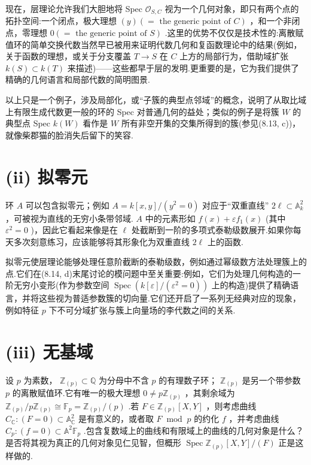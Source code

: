 现在，层理论允许我们大胆地将 Spec \({\mathcal{O}}_{S,C}\) 视为一个几何对象，即只有两个点的拓扑空间:一个闭点，极大理想 \(\left( y\right) \left( { = \text{ the generic point of }C}\right)\) ，和一个非闭点，零理想 \(0\left( { = \text{ the generic point of }S}\right)\) .这里的优势不仅仅是技术性的:离散赋值环的简单交换代数当然早已被用来证明代数几何和复函数理论中的结果(例如，关于函数的理想，或关于分支覆盖 \(T \rightarrow  S\) 在 \(C\) 上方的局部行为，借助域扩张 \(k\left( S\right)  \subset  k\left( T\right)\) 来描述)——这些都早于层的发明.更重要的是，它为我们提供了精确的几何语言和局部代数的简明图景.

以上只是一个例子，涉及局部化，或“子簇的典型点邻域”的概念，说明了从取比域上有限生成代数更一般的环的 Spec 对普通几何的益处；类似的例子是将簇 \(W\) 的典型点 Spec \(k\left( W\right)\) 看作是 \(W\) 所有非空开集的交集所得到的簇(参见(8.13, c))，就像柴郡猫的脸消失后留下的笑容.

\section{(ii) 拟零元}

环 \(A\) 可以包含拟零元；例如 \(A = k\left\lbrack  {x,y}\right\rbrack  /\left( {{y}^{2} = 0}\right)\) 对应于“双重直线” \(2\ell  \subset  {\mathbb{A}}_{k}^{2}\) ，可被视为直线的无穷小条带邻域. \(A\) 中的元素形如 \(f\left( x\right)  + \varepsilon {f}_{1}\left( x\right)\) (其中 \({\varepsilon }^{2} = 0\) )，因此它看起来像是在 \(\ell\) 处截断到一阶的多项式泰勒级数展开.如果你每天多次刻意练习，应该能够将其形象化为双重直线 \(2\ell\) 上的函数.

拟零元使层理论能够处理任意阶截断的泰勒级数，例如通过幂级数方法处理簇上的点.它们在(8.14, d)末尾讨论的模问题中至关重要:例如，它们为处理几何构造的一阶无穷小变形(作为参数空间 \(\operatorname{Spec}\left( {k\left\lbrack  \varepsilon \right\rbrack  /\left( {{\varepsilon }^{2} = 0}\right) }\right)\) 上的构造)提供了精确语言，并将这些视为普适参数簇的切向量.它们还开启了一系列无经典对应的现象，例如特征 \(p\) 下不可分域扩张与簇上向量场的李代数之间的关系.

\section{(iii) 无基域}

设 \(p\) 为素数， \({\mathbb{Z}}_{\left( p\right) } \subset  \mathbb{Q}\) 为分母中不含 \(p\) 的有理数子环； \({\mathbb{Z}}_{\left( p\right) }\) 是另一个带参数 \(p\) 的离散赋值环.它有唯一的极大理想 \(0 \neq  p{\mathbb{Z}}_{\left( p\right) }\) ，其剩余域为 \({\mathbb{Z}}_{\left( p\right) }/p{\mathbb{Z}}_{\left( p\right) } \cong  {\mathbb{F}}_{p} = {\mathbb{Z}}_{\left( p\right) }/\left( p\right)\) .若 \(F \in  {\mathbb{Z}}_{\left( p\right) }\left\lbrack  {X,Y}\right\rbrack\) ，则考虑曲线 \({C}_{\mathbb{C}} : \left( {F = 0}\right)  \subset  {\mathbb{A}}_{\mathbb{C}}^{2}\) 是有意义的，或者取 \(F{\;\operatorname{mod}\;p}\) 的约化 \(f\) ，并考虑曲线 \({C}_{p} : \left( {f = 0}\right)  \subset  {\mathbb{A}}^{2}{\mathbb{F}}_{p}\) .包含复数域上的曲线和有限域上的曲线的几何对象是什么？是否将其视为真正的几何对象见仁见智，但概形 \(\operatorname{Spec}{\mathbb{Z}}_{\left( p\right) }\left\lbrack  {X,Y}\right\rbrack  /\left( F\right)\) 正是这样做的.

